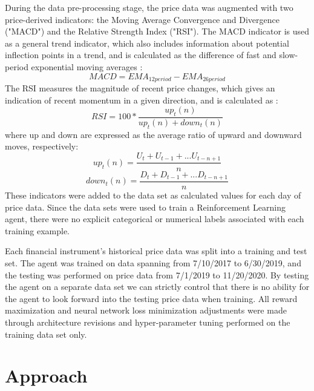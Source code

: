 \documentclass[10pt,twocolumn,letterpaper]{article}
\begin{document}
During the data pre-processing stage, the price data was augmented with two price-derived indicators: the Moving Average Convergence and Divergence ("MACD") and the Relative Strength Index ("RSI"). The MACD indicator is used as a general trend indicator, which also includes  information about potential inflection points in a trend, and is calculated as the difference of fast and slow-period exponential moving averages \cite{techanalysis}:
\begin{equation}
MACD = EMA_{12 period} - EMA_{26 period}
\end{equation}
The RSI measures the magnitude of recent price changes, which gives an indication of recent momentum in a given direction, and is calculated as \cite{techanalysis}:
\begin{equation}
RSI = 100 * \frac{up_t(n)}{up_t(n) + down_t(n)}
\end{equation}
where up and down are expressed as the average ratio of upward and downward moves, respectively:
\begin{equation}
up_t(n) = \frac{U_t + U_{t-1} + ... U_{t-n+1}}{n}
\end{equation}
\begin{equation}
down_t(n) = \frac{D_t + D_{t-1} + ... D_{t-n+1}}{n}
\end{equation}
These indicators were added to the data set as calculated values for each day of price data. Since the data sets were used to train a Reinforcement Learning agent, there were no explicit categorical or numerical labels associated with each training example.

Each financial instrument's historical price data was split into a training and test set. The agent was trained on data spanning from 7/10/2017 to 6/30/2019, and the testing was performed on price data from 7/1/2019 to 11/20/2020. By testing the agent on a separate data set we can strictly control that there is no ability for the agent to look forward into the testing price data when training. All reward maximization and neural network loss minimization adjustments were made through architecture revisions and hyper-parameter tuning performed on the training data set only.


\section{Approach}
\end{document}
